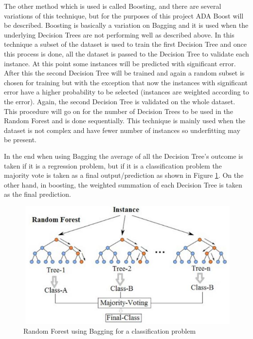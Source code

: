 \noindent The other method which is used is called Boosting, and there are several variations of this technique, but for the purposes of this project ADA Boost will be described. Boosting is basically a variation on Bagging and it is used when the underlying Decision Trees are not performing well as described above. In this technique a subset of the dataset is used to train the first Decision Tree and once this process is done, all the dataset is passed to the Decision Tree to validate each instance. At this point some instances will be predicted with significant error. After this the second Decision Tree will be trained and again a random subset is chosen for training but with the exception that now the instances with significant error have a higher probability to be selected (instances are weighted according to the error). Again, the second Decision Tree is validated on the whole dataset. This procedure will go on for the number of Decision Trees to be used in the Random Forest and is done sequentially. This technique is mainly used when the dataset is not complex and have fewer number of instances so underfitting may be present. 
 
\noindent In the end when using Bagging the average of all the Decision Tree’s outcome is taken if it is a regression problem, but if it is a classification problem the majority vote is taken as a final output/prediction as shown in Figure \ref{fig:random_forest_bag}. On the other hand, in boosting, the weighted summation of each Decision Tree is taken as the final prediction. 

\begin{figure}[H]
\centering
  \includegraphics[scale = 0.7]{imgs/random_forest_bagging.JPG}
  \caption{Random Forest using Bagging for a classification problem}
  \label{fig:random_forest_bag}
\end{figure}

 
